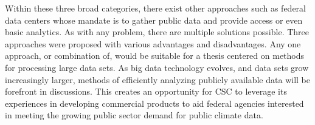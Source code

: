 Within these three broad categories, there exist other approaches such as federal data centers whose mandate is to gather public data and provide access or even basic analytics. As with any problem, there are multiple solutions possible.  Three approaches were proposed with various advantages and disadvantages. Any one approach, or combination of, would be suitable for a thesis centered on methods for processing large data sets. As big data technology evolves, and data sets grow increasingly larger, methods of efficiently analyzing publicly available data will be forefront in discussions. This creates an opportunity for \textsc{CSC} to leverage its experiences in developing commercial products to aid federal agencies interested in meeting the growing public sector demand for public climate data.